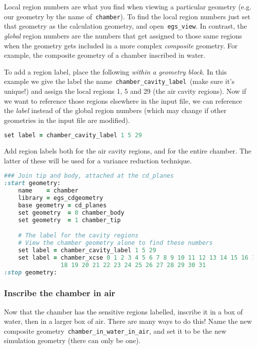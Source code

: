 \documentclass[12pt,twoside]{article}
\begin{document}
Local region numbers are what you find when viewing a particular geometry
(e.g. our geometry by the name of \,\Verb|chamber|). To find the local
region numbers just set that geometry as the calculation geometry, and
open \,\Verb|egs_view|. In contrast, the \textit{global} region numbers are the
numbers that get assigned to those same regions when the geometry gets included
in a more complex \textit{composite} geometry. For example, the composite geometry
of a chamber inscribed in water.

To add a region label, place the following \textit{within a geometry block}.
In this example we give the label the name \,\Verb|chamber_cavity_label|\,
(make sure it's unique!) and assign the local regions 1, 5 and 29
(the air cavity regions). Now if we want to reference those regions elsewhere
in the input file,
we can reference the \textit{label} instead of the global region numbers
(which may change if other geometries in the input file are modified).

{\small
\begin{lstlisting}[language=ruby,backgroundcolor=\color{white}]
set label = chamber_cavity_label 1 5 29
\end{lstlisting}
}

Add region labels both for the air cavity regions, and for the entire chamber.
The latter of these will be used for a variance reduction technique.

{\small
\begin{lstlisting}[language=ruby,backgroundcolor=\color{white}]
### Join tip and body, attached at the cd_planes
:start geometry:
    name    = chamber
    library = egs_cdgeometry
    base geometry = cd_planes
    set geometry  = 0 chamber_body
    set geometry  = 1 chamber_tip

    # The label for the cavity regions
    # View the chamber geometry alone to find these numbers
    set label = chamber_cavity_label 1 5 29
    set label = chamber_xcse 0 1 2 3 4 5 6 7 8 9 10 11 12 13 14 15 16 17 \\
                18 19 20 21 22 23 24 25 26 27 28 29 30 31
:stop geometry:
\end{lstlisting}
}

\subsubsection{Inscribe the chamber in air}

Now that the chamber has the sensitive regions labelled, inscribe it in a box
of water, then in a larger box of air. There are many ways to do this!
Name the new composite geometry
\,\Verb|chamber_in_water_in_air|, and set it to be the new simulation geometry
(there can only be one).
\end{document}
